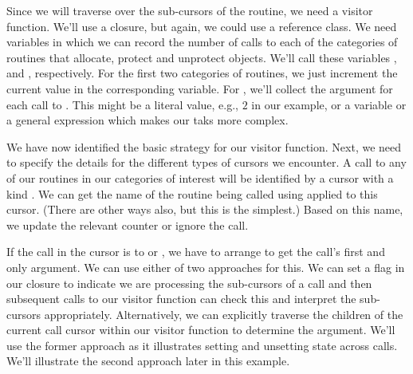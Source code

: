 Since we will traverse over the sub-cursors of the routine, we need a
visitor function. We'll use a closure, but again, we could use a
reference class.  We need variables in which we can record the number
of calls to each of the categories of routines that allocate, protect and
unprotect objects.  We'll call these variables ,
 and , respectively.
For the first two categories of routines, we just increment the
current value in the corresponding \R{} variable.  For
, we'll collect the argument for each call to
. This might be a literal value, e.g., $2$ in our
example, or a variable or a general expression which makes our taks
more complex.

We have now identified the basic strategy for our visitor function.
Next, we need to specify the details for the different types of
cursors we encounter. A call to any of our routines in our categories
of interest will be identified by a cursor with a kind
.  We can get the name of the routine being
called using  applied to this cursor. (There are other
ways also, but this is the simplest.)  Based on this name, we update
the relevant counter or ignore the call. 

If the call in the cursor is to  or
, we have to arrange to get the call's first and only
argument.  We can use either of two approaches for this.  We can set a
flag in our closure to indicate we are processing the sub-cursors of a
 call and then subsequent calls to our visitor
function can check this and interpret the sub-cursors
appropriately. Alternatively, we can explicitly traverse the children
of the current call cursor within our visitor function to determine
the argument.  We'll use the former approach as it illustrates setting
and unsetting state across calls. We'll illustrate the second approach
later in this example.

